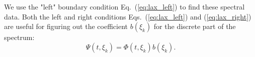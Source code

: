 We use the "left" boundary condition Eq.~(\ref{eq:lax_left}) to find these spectral data. Both the left and right conditions Eqs.~(\ref{eq:lax_left}) and (\ref{eq:lax_right}) are useful for figuring out the coefficient \(b(\xi_k)\) for the discrete part of the spectrum:
\begin{equation}
    \Psi(t, \xi_k) = \Phi(t, \xi_k)b(\xi_k).
\end{equation}



